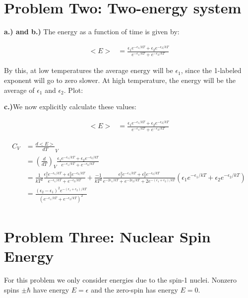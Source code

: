 \documentclass[10pt]{article} %
\begin{document}
\section{Problem Two: Two-energy system}

\textbf{a.) and b.)} The energy as a function of time is given by:

\begin{align*}
  <E> &= \frac{\epsilon_1e^{-\epsilon_1/kT} + \epsilon_2e^{-\epsilon_2/kT}}
  {e^{-\epsilon_1/kT} + e^{-\epsilon_2/kT}}
\end{align*}

By this, at low temperatures the average energy will be $\epsilon_1$, since the
1-labeled exponent will go to zero slower. At high temperature, the energy will
be the average of $\epsilon_1$ and $\epsilon_2$. Plot:

\vspace{3cm}

\textbf{c.)}We now explicitly calculate these values:

\begin{align*}
  <E>
  &= \frac{\epsilon_1e^{-\epsilon_1/kT} + \epsilon_2e^{-\epsilon_2/kT}}
  {e^{-\epsilon_1/kT} + e^{-\epsilon_2/kT}}
\end{align*}

\begin{align*}
  C_V &= \frac{d<E>}{dT}_V\\
  &= \left(\frac{d}{dT}\right)_V
  \frac{\epsilon_1e^{-\epsilon_1/kT} + \epsilon_2e^{-\epsilon_2/kT}}
       {e^{-\epsilon_1/kT} + e^{-\epsilon_2/kT}}\\
  &= \frac{1}{kT^2}\frac{\epsilon_1^2e^{-\epsilon_1/kT} + \epsilon_2^2e^{-\epsilon_2/kT}}
  {e^{-\epsilon_1/kT} + e^{-\epsilon_2/kT}}
  + \frac{-1}{kT^2}\frac{\epsilon_1^2e^{-\epsilon_1/kT} + \epsilon_2^2e^{-\epsilon_2/kT}}
  {e^{-2\epsilon_1/kT} + e^{-2\epsilon_2/kT} + 2e^{-(\epsilon_1+\epsilon_2)/kT}}
  \left(\epsilon_1e^{-\epsilon_1/kT} + \epsilon_2e^{-\epsilon_2/kT}\right)\\
  &= \frac{(\epsilon_2-\epsilon_1)^2e^{-(\epsilon_1+\epsilon_2)/kT}}
       {\left(e^{-\epsilon_1/kT} + e^{-\epsilon_2/kT}\right)^2}\\
\end{align*}

\section{Problem Three: Nuclear Spin Energy}
For this problem we only consider energies due to the spin-1 nuclei. Nonzero spins
$\pm \hbar$ have energy $E=\epsilon$ and the zero-spin has energy $E=0$.\\
\end{document}
